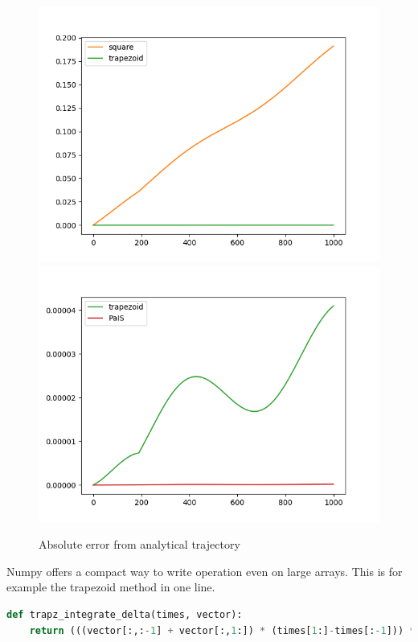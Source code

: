 \begin{figure}[H]
\includegraphics[width=\textwidth/2]{square_vs_trapezoid.png}
\includegraphics[width=\textwidth/2]{trapezoid_vs_PaIS.png}
\caption{Absolute error from analytical trajectory}
\end{figure}

\justify
Numpy offers a compact way to write operation even on large arrays. This is for example the trapezoid method in one line.

\begin{lstlisting}[language=Python,frame=single,basicstyle=\footnotesize]
def trapz_integrate_delta(times, vector):
    return (((vector[:,:-1] + vector[:,1:]) * (times[1:]-times[:-1])) * 0.5).cumsum()
\end{lstlisting}

